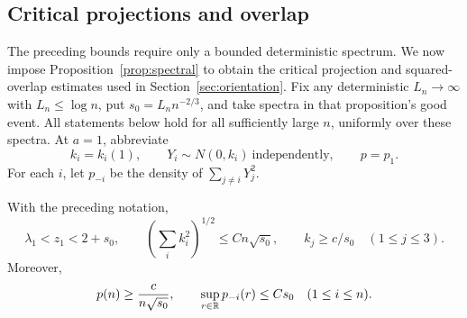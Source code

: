 \subsection{Critical projections and overlap}

The preceding bounds require only a bounded deterministic spectrum.
We now impose Proposition~\ref{prop:spectral} to obtain the critical
projection and squared-overlap estimates used in Section~\ref{sec:orientation}.
Fix any deterministic $L_n\to\infty$ with $L_n\le\log n$, put
$s_0=L_n n^{-2/3}$, and take spectra in that proposition's good event.
All statements below hold for all sufficiently large $n$, uniformly
over these spectra.  At $a=1$, abbreviate
\[
 k_i=k_i(1),\qquad
 Y_i\sim N(0,k_i)\ \text{independently},\qquad
 p=p_1.
\]
For each $i$, let $p_{-i}$ be the density of $\sum_{j\ne i}Y_j^2$.

\begin{lemma}
\label{lem:critical-sphere}
With the preceding notation,
\begin{equation}
\label{eq:critical-spherical-parameters}
 \lambda_1<z_1<2+s_0,\qquad
 \left(\sum_i k_i^2\right)^{1/2}\le Cn\sqrt{s_0},
 \qquad
 k_j\ge c/s_0\quad(1\le j\le3).
\end{equation}
Moreover,
\[
 p(n)\ge \frac{c}{n\sqrt{s_0}},
 \qquad
 \sup_{r\in\mathbb R}p_{-i}(r)\le Cs_0
 \quad(1\le i\le n).
\]
\end{lemma}


